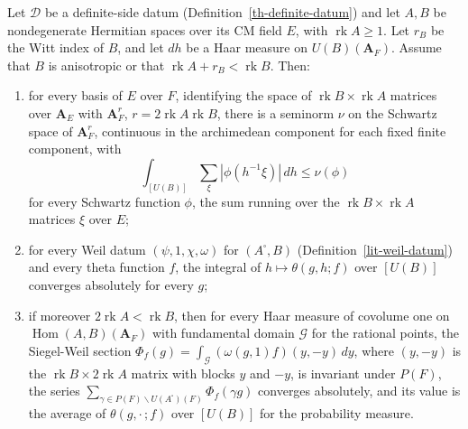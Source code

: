 \begin{theorem}\label{lit-weil-siegel}
Let $\mathcal D$ be a definite-side datum (Definition~\ref{th-definite-datum})
and let $A,B$ be nondegenerate Hermitian spaces over its CM field $E$, with
$\operatorname{rk}A\ge1$. Let $r_B$ be the Witt index of $B$, and let $dh$ be
a Haar measure on $U(B)(\mathbf A_F)$. Assume that $B$ is anisotropic or that
$\operatorname{rk}A+r_B<\operatorname{rk}B$. Then:
\begin{enumerate}
\item for every basis of $E$ over $F$, identifying the space of
  $\operatorname{rk}B\times\operatorname{rk}A$ matrices over $\mathbf A_E$ with
  $\mathbf A_F^{r}$, $r=2\operatorname{rk}A\operatorname{rk}B$, there is a
  seminorm $\nu$ on the Schwartz space of $\mathbf A_F^{r}$, continuous in the
  archimedean component for each fixed finite component, with
  \[
  \int_{[U(B)]}\sum_{\xi}|\phi(h^{-1}\xi)|\,dh\le\nu(\phi)
  \]
  for every Schwartz function $\phi$, the sum running over the
  $\operatorname{rk}B\times\operatorname{rk}A$ matrices $\xi$ over $E$;
\item for every Weil datum $(\psi,1,\chi,\omega)$ for
  $(A^\square,B)$ (Definition~\ref{lit-weil-datum}) and every theta function
  $f$, the integral of $h\mapsto\theta(g,h;f)$ over $[U(B)]$ converges
  absolutely for every $g$;
\item if moreover $2\operatorname{rk}A<\operatorname{rk}B$, then for every Haar
  measure of covolume one on $\operatorname{Hom}(A,B)(\mathbf A_F)$ with
  fundamental domain $\mathcal G$ for the rational points, the Siegel-Weil
  section $\Phi_f(g)=\int_{\mathcal G}(\omega(g,1)f)(y,-y)\,dy$, where
  $(y,-y)$ is the $\operatorname{rk}B\times2\operatorname{rk}A$ matrix with
  blocks $y$ and $-y$, is invariant
  under $P(F)$, the series $\sum_{\gamma\in P(F)\backslash U(A^\square)(F)}
  \Phi_f(\gamma g)$ converges absolutely, and its value is the average of
  $\theta(g,\cdot\,;f)$ over $[U(B)]$ for the probability measure.
\end{enumerate}
\end{theorem}


